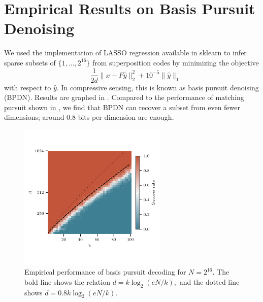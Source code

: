 \section{Empirical Results on Basis Pursuit Denoising \label{appendix:bp}}

We used the implementation of LASSO regression available in sklearn \cite{pedregosa_scikit-learn_2011} to infer sparse subsets of $\{ 1, \dots, 2^{16}\}$ from superposition codes by minimizing the objective
$$
	\quad \frac 1 {2d} \lVert x - F \hat y \rVert_2^2 + 10^{-5} \lVert \hat y \rVert_1
$$
with respect to $\hat y.$ In compressive sensing, this is known as basis pursuit denoising (BPDN). Results are graphed in . Compared to the performance of matching pursuit shown in , we find that BPDN can recover a subset from even fewer dimensions; around $0.8$ bits per dimension are enough.

\begin{figure}
	\begin{center}
		\centerline{\includegraphics[width=200pt]{figures/bp_decode_new}}
		\caption{Empirical performance of basis pursuit decoding for $N = 2^{16}.$ The bold line shows the relation $d = k \log_2(e N/k),$ and the dotted line shows $d = 0.8 k \log_2(e N/k).$}
		\label{fig:bp}
	\end{center}
\end{figure}
